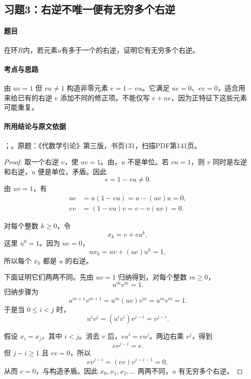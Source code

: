 \subsection{习题3：右逆不唯一便有无穷多个右逆}

\label{ex:3:3}

\paragraph{题目}

在环$R$内，若元素$u$有多于一个的右逆，证明它有无穷多个右逆。

\paragraph{考点与思路}

由 $uv=1$ 但 $vu\ne1$ 构造非零元素 $e=1-vu$。它满足 $ue=0$、$ev=0$，适合用来给已有的右逆 $v$ 添加不同的修正项。不能仅写 $v+ne$，因为正特征下这些元素可能重复。

\paragraph{所用结论与原文依据}

；。原题：《代数学引论》第三版，书页131，扫描PDF第141页。


\begin{proof}

取一个右逆 $v$，使 $uv=1$。由，$u$ 不是单位。若 $vu=1$，则 $v$ 同时是左逆和右逆，$u$ 便是单位，矛盾。因此
\[
e=1-vu\ne0.
\]
由 $uv=1$，有
\begin{align*}
ue&=u(1-vu)=u-(uv)u=0,\\
ev&=(1-vu)v=v-v(uv)=0.
\end{align*}

对每个整数 $k\ge0$，令
\[
x_k=v+eu^k,
\]
这里 $u^0=1$。因为 $ue=0$，
\[
ux_k=uv+(ue)u^k=1,
\]
所以每个 $x_k$ 都是 $u$ 的右逆。

下面证明它们两两不同。先由 $uv=1$ 归纳得到，对每个整数 $m\ge0$，
\[
u^mv^m=1.
\]
归纳步骤为
\[
u^{m+1}v^{m+1}=u^m(uv)v^m=u^mv^m=1.
\]
于是当 $0\le i<j$ 时，
\[
u^iv^j=(u^iv^i)v^{j-i}=v^{j-i}.
\]

假设 $x_i=x_j$，其中 $i<j$。消去 $v$ 后，$eu^i=eu^j$。两边右乘 $v^j$，得到
\[
ev^{j-i}=e.
\]
但 $j-i\ge1$ 且 $ev=0$，所以
\[
ev^{j-i}=(ev)v^{j-i-1}=0,
\]
从而 $e=0$，与构造矛盾。因此 $x_0,x_1,x_2,\ldots$ 两两不同，$u$ 有无穷多个右逆。

\end{proof}

